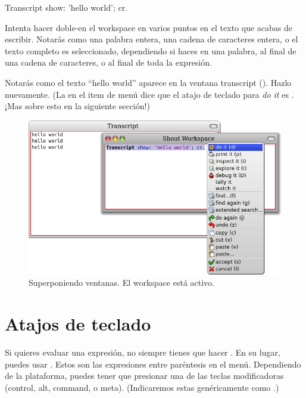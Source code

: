 \documentclass[a4paper,10pt,twoside]{book}
\begin{document}
\begin{code}{}
Transcript show: 'hello world'; cr.
\end{code}

Intenta hacer doble-\click en el workspace en varios puntos en el texto que acabas de escribir.
Notar\'as como una palabra entera, una cadena de caracteres entera, o el texto completo es seleccionado, dependiendo si haces \click en una palabra, al final de una cadena de caracteres, o al final de toda la expresi\'on.

Notar\'as como el texto ``hello world'' aparece en la ventana transcript
().
Hazlo nuevamente.
(La  en el item de men\'u  dice que el atajo de teclado para \emph{do it} es . ¡Mas sobre esto en la siguiente secci\'on!)

\begin{figure}[htb]
\centerline {\includegraphics[width=\textwidth]{HelloWorld}}
\caption{Superponiendo ventanas. El workspace est\'a activo.}
\end{figure}

\section{Atajos de teclado}

Si quieres evaluar una expresi\'on, no siempre tienes que hacer \actclick. En su lugar, puedes usar . Estos son las expresiones entre par\'entesis en el men\'u. Dependiendo de la plataforma, puedes tener que presionar una de las teclas modificadoras (control, alt, command, o meta).
(Indicaremos estas gen\'ericamente como .)
\end{document}
